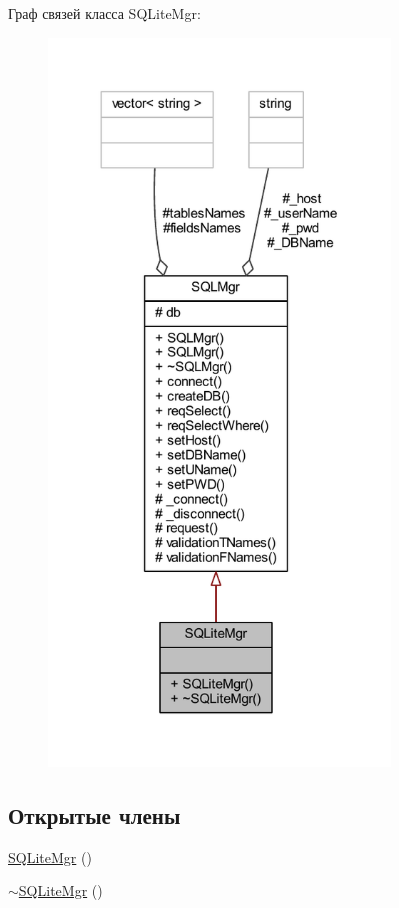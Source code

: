 Граф связей класса S\+Q\+Lite\+Mgr\+:\nopagebreak
\begin{figure}[H]
\begin{center}
\leavevmode
\includegraphics[width=257pt]{d7/deb/class_s_q_lite_mgr__coll__graph}
\end{center}
\end{figure}
\subsection*{Открытые члены}
\begin{DoxyCompactItemize}
\item 
\hyperlink{class_s_q_lite_mgr_a738f1433e21100eb53e262894c6e7095}{S\+Q\+Lite\+Mgr} ()
\item 
\hyperlink{class_s_q_lite_mgr_a341f0009a2d55b8c4642a5fcdce872ea}{$\sim$\+S\+Q\+Lite\+Mgr} ()
\end{DoxyCompactItemize}
